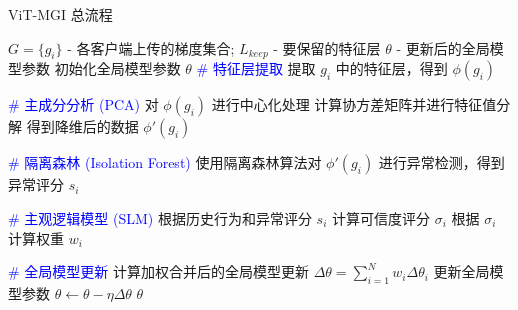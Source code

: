 \documentclass[conference]{IEEEtran}
\begin{document}
\begin{algorithm}
    \caption{ViT-MGI 总流程}
    \label{alg:vit_mgi}
    \begin{algorithmic}[1]
        \Require $G = \{g_i\}$ - 各客户端上传的梯度集合; $L_{keep}$ - 要保留的特征层
        \Ensure $\theta$ - 更新后的全局模型参数
            \State 初始化全局模型参数 $\theta$
                \State \textcolor{blue}{\# 特征层提取}
                    \State 提取 $g_i$ 中的特征层，得到 $\phi(g_i)$
                \EndFor
                
                \State \textcolor{blue}{\# 主成分分析 (PCA)}
                    \State 对 $\phi(g_i)$ 进行中心化处理
                    \State 计算协方差矩阵并进行特征值分解
                    \State 得到降维后的数据 $\phi'(g_i)$
                \EndFor
                
                \State \textcolor{blue}{\# 隔离森林 (Isolation Forest)}
                    \State 使用隔离森林算法对 $\phi'(g_i)$ 进行异常检测，得到异常评分 $s_i$
                \EndFor
                
                \State \textcolor{blue}{\# 主观逻辑模型 (SLM)}
                    \State 根据历史行为和异常评分 $s_i$ 计算可信度评分 $\sigma_i$
                    \State 根据 $\sigma_i$ 计算权重 $w_i$
                \EndFor
                
                \State \textcolor{blue}{\# 全局模型更新}
                \State 计算加权合并后的全局模型更新 $\Delta \theta = \sum_{i=1}^N w_i \Delta \theta_i$
                \State 更新全局模型参数 $\theta \leftarrow \theta - \eta \Delta \theta$
            \EndFor
        \EndFunction
        \State \Return $\theta$
    \end{algorithmic}
\end{algorithm}








\end{document}
